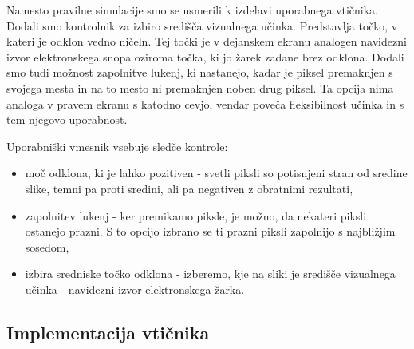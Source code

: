\documentclass[a4paper, 12pt]{book}
\begin{document}
Namesto pravilne simulacije smo se usmerili k izdelavi uporabnega vtičnika.
Dodali smo kontrolnik za izbiro središča vizualnega učinka.
Predstavlja točko, v kateri je odklon vedno ničeln.
Tej točki je v dejanskem ekranu analogen navidezni izvor elektronskega snopa oziroma točka, ki jo žarek zadane brez odklona.
Dodali smo tudi možnost zapolnitve lukenj, ki nastanejo, kadar je piksel premaknjen s svojega mesta in na to mesto ni premaknjen noben drug piksel.
Ta opcija nima analoga v pravem ekranu s katodno cevjo, vendar poveča fleksibilnost učinka in s tem njegovo uporabnost.

Uporabniški vmesnik vsebuje sledče kontrole:
\begin{itemize}
\item{moč odklona, ki je lahko pozitiven - svetli piksli so potisnjeni stran od sredine slike, temni pa proti sredini, ali pa negativen z obratnimi rezultati,}
\item{zapolnitev lukenj - ker premikamo piksle, je možno, da nekateri piksli ostanejo prazni. S to opcijo izbrano se ti prazni piksli zapolnijo s najbližjim sosedom,}
\item{izbira sredniske točko odklona - izberemo, kje na sliki je središče vizualnega učinka - navidezni izvor elektronskega žarka.}
\end{itemize}


\subsection{Implementacija vtičnika}
\end{document}
